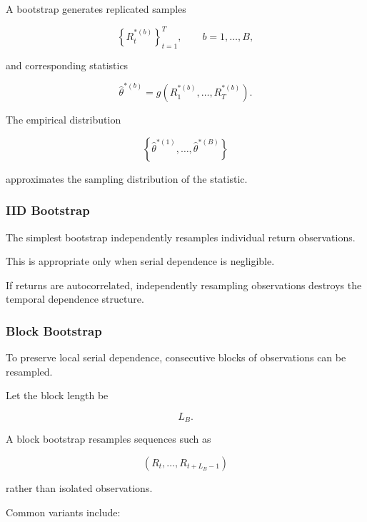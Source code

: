 \documentclass[11pt,a4paper]{article}
\begin{document}
A bootstrap generates replicated samples

\begin{equation}
\left\{
R_t^{*(b)}
\right\}_{t=1}^{T},
\qquad
b=1,\ldots,B,
\end{equation}

and corresponding statistics

\begin{equation}
\boxed{
\widehat{\theta}^{*(b)}
=
g
\left(
R_1^{*(b)},
\ldots,
R_T^{*(b)}
\right).
}
\end{equation}

The empirical distribution

\begin{equation}
\left\{
\widehat{\theta}^{*(1)},
\ldots,
\widehat{\theta}^{*(B)}
\right\}
\end{equation}

approximates the sampling distribution of the statistic.


\subsubsection{IID Bootstrap}

The simplest bootstrap independently resamples individual return observations.

This is appropriate only when serial dependence is negligible.

If returns are autocorrelated, independently resampling observations destroys
the temporal dependence structure.


\subsubsection{Block Bootstrap}

To preserve local serial dependence, consecutive blocks of observations can be
resampled.

Let the block length be

\begin{equation}
L_B.
\end{equation}

A block bootstrap resamples sequences such as

\begin{equation}
(R_t,\ldots,R_{t+L_B-1})
\end{equation}

rather than isolated observations.

Common variants include:
\end{document}

